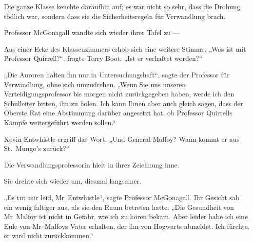 Die ganze Klasse keuchte daraufhin auf; es war nicht so sehr, dass die Drohung tödlich war, sondern dass sie die Sicherheitsregeln für Verwandlung brach.

Professor McGonagall wandte sich wieder ihrer Tafel zu —

Aus einer Ecke des Klassenzimmers erhob sich eine weitere Stimme.
„Was ist mit Professor Quirrell?“, fragte Terry Boot.
„Ist er verhaftet worden?“

„Die Auroren halten ihn nur in Untersuchungshaft“, sagte der Professor für Verwandlung, ohne sich umzudrehen.
„Wenn Sie uns unseren Verteidigungsprofessor bis morgen nicht zurückgegeben haben, werde ich den Schulleiter bitten, ihn zu holen. Ich kann Ihnen aber auch gleich sagen, dass der Oberste Rat eine Abstimmung darüber angesetzt hat, ob Professor Quirrells Kämpfe weitergeführt werden sollen.“

Kevin Entwhistle ergriff das Wort.
„Und General Malfoy? Wann kommt er aus St.~Mungo’s zurück?“

Die Verwandlungsprofessorin hielt in ihrer Zeichnung inne.

Sie drehte sich wieder um, diesmal langsamer.

„Es tut mir leid, Mr~Entwhistle“, sagte Professor McGonagall. Ihr Gesicht sah ein wenig faltiger aus, als sie den Raum betreten hatte.
„Die Gesundheit von Mr~Malfoy ist nicht in Gefahr, wie ich zu hören bekam. Aber leider habe ich eine Eule von Mr~Malfoys Vater erhalten, der ihn von Hogwarts abmeldet. Ich fürchte, er wird nicht zurückkommen.“

